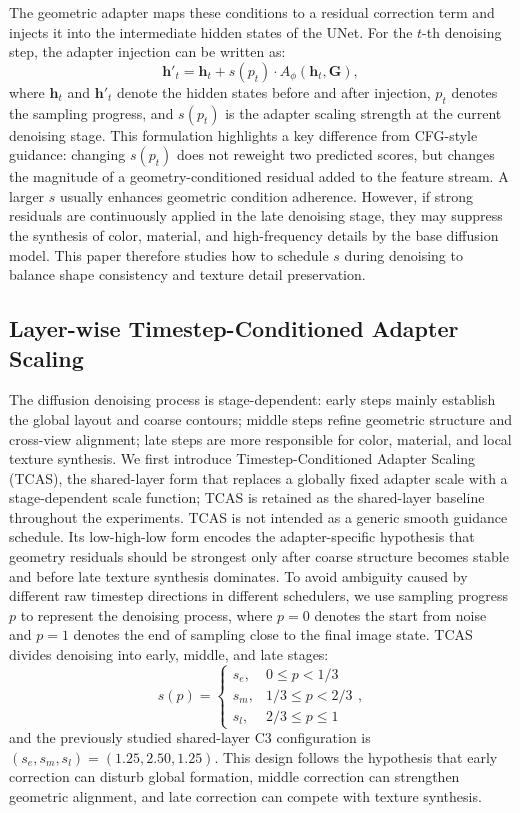 \documentclass[times,twocolumn,final]{elsarticle}
\begin{document}
The geometric adapter maps these conditions to a residual correction term and injects it into the intermediate hidden states of the UNet. For the $t$-th denoising step, the adapter injection can be written as:
\begin{equation}
\mathbf{h}'_t = \mathbf{h}_t + s(p_t) \cdot A_\phi(\mathbf{h}_t, \mathbf{G}),
\label{eq:injection}
\end{equation}
where $\mathbf{h}_t$ and $\mathbf{h}'_t$ denote the hidden states before and after injection, $p_t$ denotes the sampling progress, and $s(p_t)$ is the adapter scaling strength at the current denoising stage. This formulation highlights a key difference from CFG-style guidance: changing $s(p_t)$ does not reweight two predicted scores, but changes the magnitude of a geometry-conditioned residual added to the feature stream. A larger $s$ usually enhances geometric condition adherence. However, if strong residuals are continuously applied in the late denoising stage, they may suppress the synthesis of color, material, and high-frequency details by the base diffusion model. This paper therefore studies how to schedule $s$ during denoising to balance shape consistency and texture detail preservation.

\subsection{Layer-wise Timestep-Conditioned Adapter Scaling}
\label{subsec:tcas}

The diffusion denoising process is stage-dependent: early steps mainly establish the global layout and coarse contours; middle steps refine geometric structure and cross-view alignment; late steps are more responsible for color, material, and local texture synthesis. We first introduce Timestep-Conditioned Adapter Scaling (TCAS), the shared-layer form that replaces a globally fixed adapter scale with a stage-dependent scale function; TCAS is retained as the shared-layer baseline throughout the experiments. TCAS is not intended as a generic smooth guidance schedule. Its low-high-low form encodes the adapter-specific hypothesis that geometry residuals should be strongest only after coarse structure becomes stable and before late texture synthesis dominates. To avoid ambiguity caused by different raw timestep directions in different schedulers, we use sampling progress $p$ to represent the denoising process, where $p = 0$ denotes the start from noise and $p = 1$ denotes the end of sampling close to the final image state. TCAS divides denoising into early, middle, and late stages:
\begin{equation}
s(p) = \begin{cases} s_e, & 0 \leq p < 1/3 \\ s_m, & 1/3 \leq p < 2/3 \\ s_l, & 2/3 \leq p \leq 1 \end{cases},
\label{eq:tcas}
\end{equation}
and the previously studied shared-layer C3 configuration is $(s_e, s_m, s_l) = (1.25, 2.50, 1.25)$. This design follows the hypothesis that early correction can disturb global formation, middle correction can strengthen geometric alignment, and late correction can compete with texture synthesis.
\end{document}
